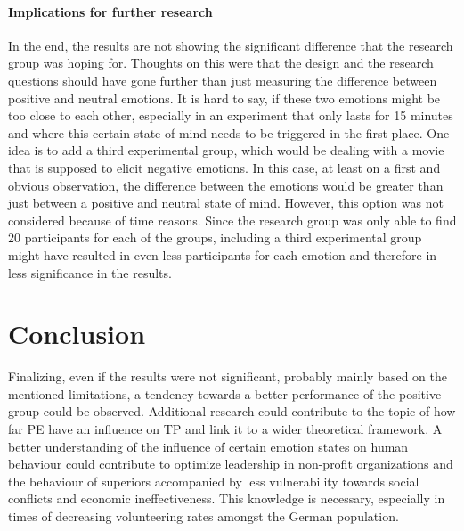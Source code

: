 \documentclass[	
	12pt, %
	a4paper, %
  abstracton
]{scrartcl}\usepackage[]{graphicx}\usepackage[]{color}
\begin{document}
\paragraph{Implications for further research}
In the end, the results are not showing the significant difference that the research group was hoping for. Thoughts on this were that the design and the research questions should have gone further than just measuring the difference between positive and neutral emotions. It is hard to say, if these two emotions might be too close to each other, especially in an experiment that only lasts for 15 minutes and where this certain state of mind needs to be triggered in the first place. One idea is to add a third experimental group, which would be dealing with a movie that is supposed to elicit negative emotions. In this case, at least on a first and obvious observation, the difference between the emotions would be greater than just between a positive and neutral state of mind. However, this option was not considered because of time reasons. Since the research group was only able to find 20 participants for each of the groups, including a third experimental group might have resulted in even less participants for each emotion and therefore in less significance in the results.


\section*{Conclusion}
Finalizing, even if the results were not significant, probably mainly based on the mentioned limitations, a tendency towards a better performance of the positive group could be observed. Additional research could contribute to the topic of how far PE have an influence on TP and link it to a wider theoretical framework. A better understanding of the influence of certain emotion states on human behaviour could contribute to optimize leadership in non-profit organizations and the behaviour of superiors accompanied by less vulnerability towards social conflicts and economic ineffectiveness. This knowledge is necessary, especially in times of decreasing volunteering rates amongst the German population.


\renewcommand{\bibliographytypesize}{\small} %

\end{document}
